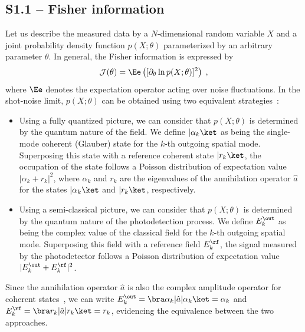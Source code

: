 \documentclass[aps,pra,twocolumn,amsmath,amssymb,superscriptaddress,10pt,nobibnotes]{revtex4-2}
\begin{document}
\subsection*{S1.1 -- Fisher information}
Let us describe the measured data by a $N$-dimensional random variable $X$ and a joint probability density function $p(X;\theta)$ parameterized by an arbitrary parameter $\theta$. In general, the Fisher information is expressed by~\cite{kay_fundamentals_1993_1}
\begin{equation}
\mathcal{J}(\theta)= \Ee \left( [ \partial_\theta \ln p(X;\theta) ]^2 \right)\; ,
\label{def_information}
\end{equation}
where $\Ee $ denotes the expectation operator acting over noise fluctuations. In the shot-noise limit, $p(X;\theta)$ can be obtained using two equivalent strategies~\cite{mandel_optical_1995_1}:
\begin{itemize}
	\item Using a fully quantized picture, we can consider that $p(X;\theta)$ is determined by the quantum nature of the field. We define $|\alpha_k \ket$ as being the single-mode coherent (Glauber) state for the $k$-th outgoing spatial mode. Superposing this state with a reference coherent state $|r_k\ket$, the occupation of the state follows a Poisson distribution of expectation value $| \alpha_k+r_k|^2$, where $\alpha_k$ and $r_k$ are the eigenvalues of the annihilation operator $\hat{a}$ for the states $|\alpha_k \ket$ and $|r_k \ket$, respectively.  
	\item Using a semi-classical picture, we can consider that $p(X;\theta)$ is determined by the quantum nature of the photodetection process. We define $E_k^\out$ as being the complex value of the classical field for the $k$-th outgoing spatial mode. Superposing this field with a reference field $E_k^\rf$, the signal measured by the photodetector follows a Poisson distribution of expectation value $|E_k^\out+E_k^\rf|^2$.
\end{itemize}
Since the annihilation operator $\hat{a}$ is also the complex amplitude operator for coherent states~\cite{mandel_optical_1995_1}, we can write $E_k^\out=\bra \alpha_k | \hat{a} | \alpha_k \ket =\alpha_k$ and $E_k^\rf=\bra r_k | \hat{a} | r_k \ket =r_k$, evidencing the equivalence between the two approaches.
\end{document}
